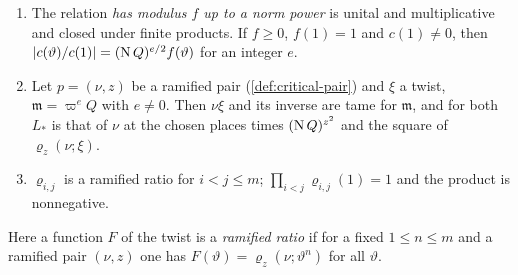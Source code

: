 \begin{proposition}[Moduli]\label{prop:moduli}
\begin{enumerate}[label=\textup{(\alph*)}]
\item The relation \emph{has modulus $f$ up to a norm power} is unital and multiplicative and closed under finite products. If $f\ge0$, $f(1)=1$ and $c(1)\ne0$, then $\lvert c(\vartheta)/c(1)\rvert=(\operatorname{N} Q)^{e/2}f(\vartheta)$ for an
integer $e$.
\item Let $p=(\nu,z)$ be a ramified pair (\cref{def:critical-pair}) and $\xi$ a twist, $\mathfrak m=\varpi^eQ$ with $e\ne0$. Then $\nu\xi$ and its inverse are tame for $\mathfrak m$, and for both $L_*$ is that of $\nu$ at the chosen
places times $(\operatorname{N} Q)^{z^2}$ and the square of $\varrho_z(\nu;\xi)$.
\item $\varrho_{i,j}$ is a ramified ratio for $i<j\le m$; $\prod_{i<j}\varrho_{i,j}(1)=1$ and the product is nonnegative.
\end{enumerate}
\end{proposition}

Here a function $F$ of the twist is a \emph{ramified ratio} if for a fixed $1\le n\le m$ and a ramified pair $(\nu,z)$ one has $F(\vartheta)=\varrho_z(\nu;\vartheta^n)$ for all $\vartheta$.

